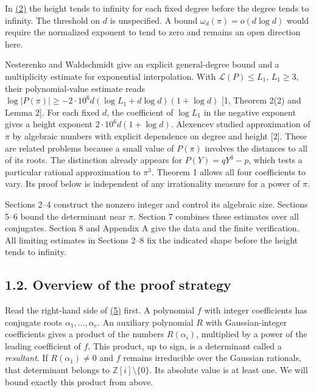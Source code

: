\documentclass[11pt,a4paper]{article}
\begin{document}
In \hyperref[eq:2]{(2)} the height tends to infinity for each fixed degree before the degree tends to infinity. The threshold on \(d\) is unspecified. A bound \(\omega_d(\pi)=o(d\log d)\) would require the normalized exponent to tend to zero and remains an open direction here.

Nesterenko and Waldschmidt give an explicit general-degree bound and a multiplicity estimate for exponential interpolation. With \(\mathcal L(P)\le L_1\), \(L_1\ge3\), their polynomial-value estimate reads \(\log|P(\pi)|\ge-2\cdot10^6d(\log L_1+d\log d)(1+\log d)\) {[}1, Theorem 2(2) and Lemma 2{]}. For each fixed \(d\), the coefficient of \(\log L_1\) in the negative exponent gives a height exponent \(2\cdot10^6d(1+\log d)\). Alexencev studied approximation of \(\pi\) by algebraic numbers with explicit dependence on degree and height {[}2{]}. These are related problems because a small value of \(P(\pi)\) involves the distances to all of its roots. The distinction already appears for \(P(Y)=qY^3-p\), which tests a particular rational approximation to \(\pi^3\). Theorem 1 allows all four coefficients to vary. Its proof below is independent of any irrationality measure for a power of \(\pi\).

Sections 2--4 construct the nonzero integer and control its algebraic size. Sections 5--6 bound the determinant near \(\pi\). Section 7 combines these estimates over all conjugates. Section 8 and Appendix A give the data and the finite verification. All limiting estimates in Sections 2--8 fix the indicated shape before the height tends to infinity.

\subsection{1.2. Overview of the proof strategy}\label{overview-of-the-proof-strategy}

Read the right-hand side of \hyperref[eq:5]{(5)} first. A polynomial \(f\) with integer coefficients has conjugate roots \(\alpha_1,\ldots,\alpha_e\). An auxiliary polynomial \(R\) with Gaussian-integer coefficients gives a product of the numbers \(R(\alpha_i)\), multiplied by a power of the leading coefficient of \(f\). This product, up to sign, is a determinant called a \emph{resultant}. If \(R(\alpha_1)\ne0\) and \(f\) remains irreducible over the Gaussian rationals, that determinant belongs to \(\mathbb Z[i]\setminus\{0\}\). Its absolute value is at least one. We will bound exactly this product from above.
\end{document}
